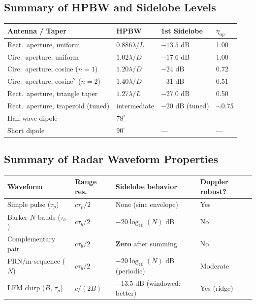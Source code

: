 \documentclass[10pt,letterpaper]{article}
\newcommand{\degrees}{^{\circ}}
\begin{document}
\subsection{Summary of HPBW and Sidelobe Levels}

\begin{center}
\begin{tabular}{p{4cm}lll}
\toprule
\textbf{Antenna / Taper} & \textbf{HPBW} & \textbf{1st Sidelobe} & \textbf{$\eta_{ap}$} \\
\midrule
Rect.\ aperture, uniform & $0.886\lambda/L$ & $-13.5$ dB & 1.00 \\
Circ.\ aperture, uniform & $1.02\lambda/D$ & $-17.6$ dB & 1.00 \\
Circ.\ aperture, cosine ($n=1$) & $1.20\lambda/D$ & $-24$ dB & 0.72 \\
Circ.\ aperture, cosine$^2$ ($n=2$) & $1.40\lambda/D$ & $-31$ dB & 0.51 \\
Rect.\ aperture, triangle taper & $1.27\lambda/L$ & $-27.0$ dB & 0.50 \\
Rect.\ aperture, trapezoid (tuned) & intermediate & $-20$ dB (tuned) & $\sim$0.75 \\
Half-wave dipole & $78\degrees$ & --- & --- \\
Short dipole & $90\degrees$ & --- & --- \\
\bottomrule
\end{tabular}
\end{center}

\subsection{Summary of Radar Waveform Properties}

\begin{center}
\begin{tabular}{p{3cm}lll}
\toprule
\textbf{Waveform} & \textbf{Range res.} & \textbf{Sidelobe behavior} & \textbf{Doppler robust?} \\
\midrule
Simple pulse ($\tau_p$) & $c\tau_p/2$ & None (sinc envelope) & Yes \\
Barker $N$ bauds ($\tau_b$) & $c\tau_b/2$ & $-20\log_{10}(N)$ dB & No \\
Complementary pair & $c\tau_b/2$ & \textbf{Zero} after summing & No \\
PRN/m-sequence ($N$) & $c\tau_b/2$ & $-20\log_{10}(N)$ dB (periodic) & Moderate \\
LFM chirp ($B$, $\tau_p$) & $c/(2B)$ & $-13.5$ dB (windowed: better) & Yes (ridge) \\
\bottomrule
\end{tabular}
\end{center}
\end{document}
